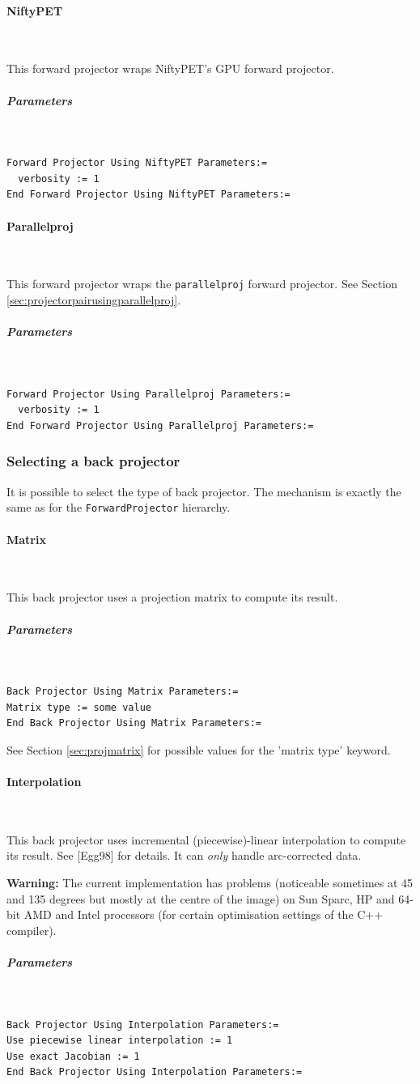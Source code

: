 \documentclass{article}
\newcommand{\subsubsubsection}[1]{\paragraph{#1}\mbox{} \\}
\newcommand{\subsubsubsubsection}[1]{\subparagraph{#1} \mbox{} \\}
\begin{document}
{{{ \subsubsubsection{NiftyPET}
}
This forward projector wraps NiftyPET's GPU forward projector.

{ \subsubsubsubsection{Parameters}
}
\begin{verbatim}
Forward Projector Using NiftyPET Parameters:=
  verbosity := 1
End Forward Projector Using NiftyPET Parameters:=
\end{verbatim}

{ \subsubsubsection{Parallelproj}
}
This forward projector wraps the \texttt{parallelproj} forward projector.
See Section \ref{sec:projectorpairusingparallelproj}.

{ \subsubsubsubsection{Parameters}
}
\begin{verbatim}
Forward Projector Using Parallelproj Parameters:=
  verbosity := 1
End Forward Projector Using Parallelproj Parameters:=
\end{verbatim}

\subsubsection{
Selecting a back projector}
\label{sec:backprojectors}
It is possible to select the type of back projector. The mechanism 
is exactly the same as for the \texttt{ForwardProjector} hierarchy.

{ \subsubsubsection{Matrix}
}
This back projector uses a projection matrix to compute its result.

{ \subsubsubsubsection{Parameters}
}
\begin{verbatim}
Back Projector Using Matrix Parameters:=
Matrix type := some value
End Back Projector Using Matrix Parameters:=
\end{verbatim}

See Section \ref{sec:projmatrix} for possible values for the 'matrix type' keyword.

{ \subsubsubsection{Interpolation}
}
\label{sec:IncrementalInterpolationBackProjector}
This back projector uses incremental (piecewise)-linear interpolation 
to compute its result. See [Egg98] for details. It can \textit{only} handle arc-corrected data.


\textbf{Warning:} The current implementation has problems (noticeable 
sometimes at 45 and 135 degrees but mostly at the centre of the image) on Sun 
Sparc, HP and 64-bit AMD and Intel processors (for certain optimisation settings
of the C++ compiler).

{ \subsubsubsubsection{Parameters}
}
\begin{verbatim}
Back Projector Using Interpolation Parameters:=
Use piecewise linear interpolation := 1
Use exact Jacobian := 1
End Back Projector Using Interpolation Parameters:=
\end{verbatim}

}}
\end{document}
